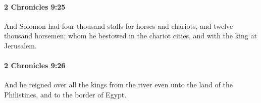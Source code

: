 		\paragraph{2 Chronicles 9:25} %
			\label{2CHRONICLES-9-25}

			And Solomon had four thousand stalls for horses and chariots, and twelve thousand horsemen; whom he bestowed in the chariot cities, and with the king at Jerusalem.


		\paragraph{2 Chronicles 9:26} %
			\label{2CHRONICLES-9-26}

			And he reigned over all the kings from the river even unto the land of the Philistines, and to the border of Egypt.


